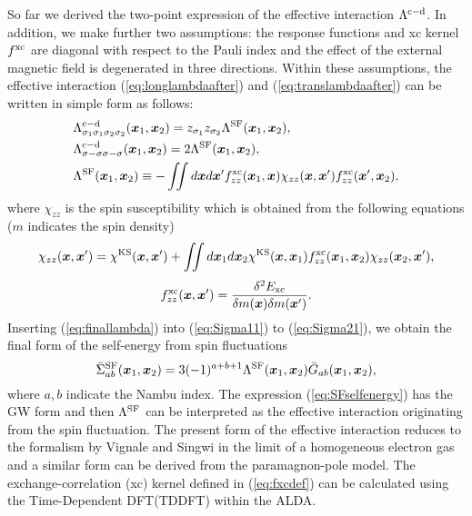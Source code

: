 So far we derived the two-point expression of the effective interaction $\Lambda^{\rm c - \rm d}$.
In addition, we make further two assumptions: the response functions and xc kernel $f^{\rm xc}$ are
diagonal with respect to the Pauli index and the effect of the external magnetic field is degenerated
in three directions. Within these assumptions, the effective interaction (\ref{eq:longlambdaafter}) and
(\ref{eq:translambdaafter}) can be written in simple form as follows:
%
\begin{equation}
	\begin{split}
	&\Lambda^{\rm c - \rm d}_{\sigma_1\sigma_1\sigma_2\sigma_2}(\bm x_1, \bm x_2) = 
	z_{\sigma_1}z_{\sigma_2}\Lambda^{\rm SF}(\bm x_1,\bm x_2), \\
	&\Lambda^{\rm c - \rm d}_{\sigma-\sigma\sigma-\sigma}(\bm x_1, \bm x_2) = 
	2\Lambda^{\rm SF}(\bm x_1,\bm x_2), \\
	&\Lambda^{\rm SF}(\bm x_1,\bm x_2) \equiv -\iint d\bm x d\bm x'
	f^{\rm xc}_{zz}(\bm x_1,\bm x)\chi_{zz}(\bm x,\bm x')f^{\rm xc}_{zz}(\bm x',\bm x_2),
	\label{eq:finallambda}
\end{split}
\end{equation}
%
where $\chi_{zz}$ is the spin susceptibility which is obtained from the following equations
($m$ indicates the spin density)
%
\begin{equation}
	\chi_{zz}(\bm x,\bm x') = \chi^{\rm KS}(\bm x,\bm x') + 
	\iint d\bm x_1 d\bm x_2 \chi^{\rm KS}(\bm x, \bm x_1)f^{\rm xc}_{zz}(\bm x_1, \bm x_2)
	\chi_{zz}(\bm x_2,\bm x'),
	\label{eq:chis}
\end{equation}
%
\begin{equation}
	f^{\rm xc}_{zz}(\bm x,\bm x') = \frac{\delta^2 E_{\rm xc}}{\delta m(\bm x) \delta m(\bm x')}.
	\label{eq:fxcdef}
\end{equation}
%
Inserting (\ref{eq:finallambda}) into (\ref{eq:Sigma11}) to (\ref{eq:Sigma21}), we obtain the 
final form of the self-energy from spin fluctuations
%
\begin{equation}
	\bar{\Sigma}^{\rm SF}_{ab}(\bm x_1,\bm x_2) = 3(-1)^{a+b+1}
	\Lambda^{\rm SF}(\bm x_1, \bm x_2) \bar{G}_{ab}(\bm x_1, \bm x_2),
	\label{eq:SFselfenergy}
\end{equation}
%
where $a, b$ indicate the Nambu index.
The expression (\ref{eq:SFselfenergy}) has the GW form and then $\Lambda^{\rm SF}$ can be interpreted
as the effective interaction originating from the spin fluctuation.
The present form of the effective interaction reduces to the formalism by Vignale and Singwi\cite{Vignale1985} 
in the limit of a homogeneous electron gas and a similar form can be derived from the 
paramagnon-pole model\cite{Zhu1986}.
The exchange-correlation (xc) kernel defined in (\ref{eq:fxcdef}) can be calculated using the Time-Dependent DFT(TDDFT)
\cite{Runge1984} within the ALDA.

